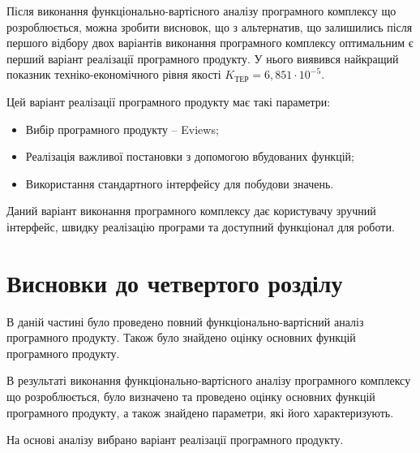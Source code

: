 \documentclass[../diploma]{subfiles}
\begin{document}
Після виконання функціонально-вартісного аналізу програмного комплексу що розроблюється, можна зробити висновок, що з альтернатив, що залишились після першого відбору двох варіантів виконання програмного комплексу оптимальним є перший варіант реалізації програмного продукту. У нього виявився найкращий показник техніко-економічного рівня якості $K_{ТЕР} = 6,851\cdot 10^{-5}$.

Цей варіант реалізації програмного продукту має такі параметри:
\begin{itemize}
\item Вибір програмного продукту – Eviews;
\item Реалізація важливої постановки з допомогою вбудованих функцій;
\item Використання стандартного інтерфейсу для побудови значень. 
\end{itemize}

Даний варіант виконання програмного комплексу дає користувачу зручний інтерфейс, швидку реалізацію програми та доступний функціонал для роботи.

\section{Висновки до четвертого розділу}

В даній частині було проведено повний функціонально-вартісний аналіз програмного продукту. Також було знайдено оцінку основних функцій програмного продукту.

В результаті виконання функціонально-вартісного аналізу програмного комплексу що розроблюється, було визначено та проведено оцінку основних функцій програмного продукту, а також знайдено параметри, які його характеризують.

На основі аналізу вибрано варіант реалізації програмного продукту.
\end{document}
